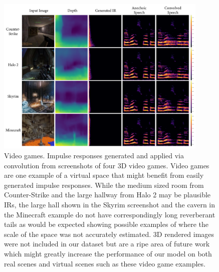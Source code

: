 \begin{figure}
    \centering
    \includegraphics[width=0.9\textwidth]{p_videogame.png}
    \caption{Video games. Impulse responses generated and applied via convolution from screenshots of four 3D video games. Video games are one example of a virtual space that might benefit from easily generated impulse responses. While the medium sized room from Counter-Strike and the large hallway from Halo 2 may be plausible IRs, the large hall shown in the Skyrim screenshot and the cavern in the Minecraft example do not have correspondingly long reverberant tails as would be expected showing possible examples of where the scale of the space was not accurately estimated. 3D rendered images were not included in our dataset but are a ripe area of future work which might greatly increase the performance of our model on both real scenes and virtual scenes such as these video game examples.}
    \label{fig:p_videogame}
\end{figure}

